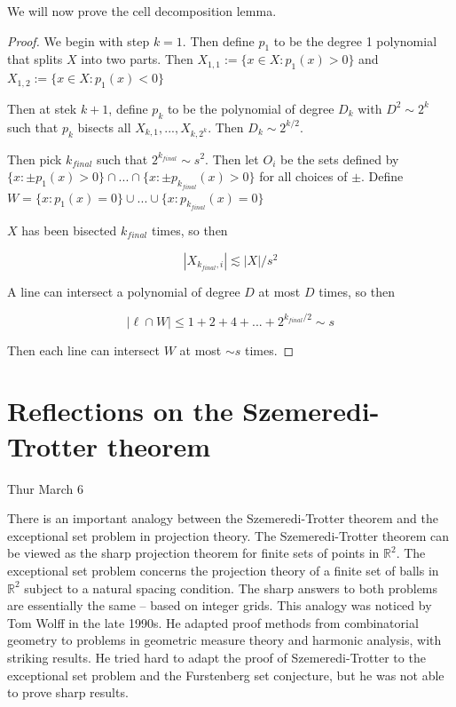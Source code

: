 \documentclass[12pt]{amsart}
\newcommand{\RR}{\mathbb{R}}
\begin{document}
We will now prove the cell decomposition lemma. 

\begin{proof}
    We begin with step $k=1$. Then define $p_1$ to be the degree 1 polynomial that splits $X$ into two parts. Then $X_{1,1} := \{x \in X:  p_1(x) > 0\}$ and $X_{1,2} := \{x \in X:  p_1(x) < 0\}$

    Then at stek $k+1$, define $p_k$ to be the polynomial of degree $D_k$ with $D^2 \sim 2^{k}$ such that $p_k$ bisects all $X_{k,1},..., X_{k, 2^k}$. Then $D_k \sim 2^{k/2}$. 

    Then pick $k_{final} $ such that $2^{k_{final}} \sim s^2$. Then let $O_i$ be the sets defined by $\{x: \pm p_1(x) > 0\}  \cap ... \cap \{x: \pm p_{k_{final}}(x) > 0\}$ for all choices of $\pm$. Define $W = \{x: p_1(x) = 0\} \cup ... \cup \{x: p_{k_{final}}(x) = 0\}$
    
    $X$ has been bisected $k_{final}$ times, so then 

    \[|X_{k_{final}, i}| \lesssim |X|/s^2\] 

    A line can intersect a polynomial of degree $D$ at most $D$ times, so then 

    \[|\ell \cap W| \leq 1 + 2 + 4 + ... + 2^{k_{final}/2} \sim s \]

    Then each line can intersect $W$ at most $\sim s$ times. 
\end{proof}

\newpage


\section{Reflections on the Szemeredi-Trotter theorem}

Thur March 6

There is an important analogy between the Szemeredi-Trotter theorem and the exceptional set problem in projection theory.   The Szemeredi-Trotter theorem can be viewed as the sharp projection theorem for finite sets of points in $\RR^2$.   The exceptional set problem concerns the projection theory of a finite set of balls in $\RR^2$ subject to a natural spacing condition.   The sharp answers to both problems are essentially the same -- based on integer grids.   This analogy was noticed by Tom Wolff in the late 1990s.   He adapted proof methods from combinatorial geometry to problems in geometric measure theory and harmonic analysis,  with striking results.   He tried hard to adapt the proof of Szemeredi-Trotter to the exceptional set problem and the Furstenberg set conjecture,  but he was not able to prove sharp results.   
\end{document}

